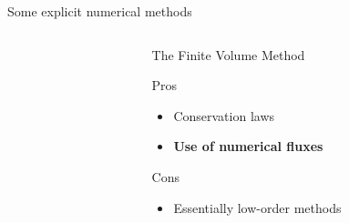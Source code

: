 \begin{withoutheadline}
\begin{frame}{Some explicit numerical methods}
\begin{overprint}
\begin{columns}
\begin{column}{0.49\textwidth}
        \end{column}
        \begin{column}{0.49\textwidth}
          \begin{block}{The Finite Volume Method \cite{Leveque}}
            \begin{footnotesize}
              \begin{block}{\footnotesize Pros}
                \vspace{-0.2cm}
                \begin{itemize}
                \item[] Conservation laws %
                \item[] \textbf{Use of numerical fluxes} \cite{Godunov_method,Thomas_EP}
                \end{itemize}
              \end{block}
              \vspace{-0.2cm}
              \begin{block}{\footnotesize Cons}
                \vspace{-0.2cm}
                \begin{itemize}
                \item[] Essentially low-order methods
                \end{itemize}
              \end{block}
            \end{footnotesize}
          \end{block}
        \end{column}
      \end{columns}
      \vspace{-0.3cm} 
      

\end{overprint}
\end{frame}
\end{withoutheadline}
